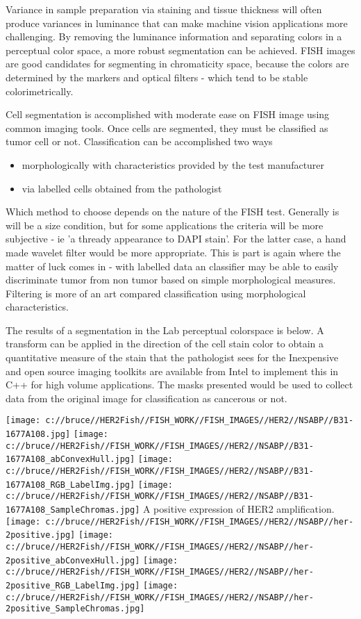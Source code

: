\documentclass[10pt]{amsart}
\theoremstyle{definition}
\theoremstyle{remark}
\numberwithin{equation}{section}
\begin{document}
Variance in sample preparation via staining and tissue thickness
will often produce variances in luminance that can make machine
vision applications more challenging.  By removing the luminance
information and separating colors in a perceptual color space, a
more robust segmentation can be achieved.  FISH images are good
candidates for segmenting in chromaticity space, because the
colors are determined by the markers and optical filters - which
tend to be stable colorimetrically.

Cell segmentation is accomplished with moderate ease on FISH image
using common imaging tools. Once cells are segmented, they must be
classified as tumor cell or not. Classification can be
accomplished two ways
\begin{itemize} \item morphologically with characteristics
provided by the test manufacturer \item via labelled cells
obtained from the pathologist
\end{itemize}
Which method to choose depends on the nature of the FISH test.
Generally is will be a size condition, but for some applications
the criteria will be more subjective - ie 'a thready appearance to
DAPI stain'.  For the latter case, a hand made wavelet filter
would be more appropriate.  This is part is again where the matter
of luck comes in - with labelled data an classifier may be able to
easily discriminate tumor from non tumor based on simple
morphological measures.  Filtering is more of an art compared
classification using morphological characteristics.

The results of a segmentation in the Lab perceptual colorspace is
below.  A transform can be applied in the direction of the cell
stain color to obtain a quantitative measure of the stain that the
pathologist sees for the Inexpensive and open source imaging
toolkits are available from Intel to implement this in C++ for
high volume applications.  The masks presented would be used to
collect data from the original image for classification as
cancerous or not.

\newpage
\texttt{[image: c://bruce//HER2Fish//FISH\_WORK//FISH\_IMAGES//HER2//NSABP//B31-1677A108.jpg]}
\texttt{[image: c://bruce//HER2Fish//FISH\_WORK//FISH\_IMAGES//HER2//NSABP//B31-1677A108\_abConvexHull.jpg]}
\texttt{[image: c://bruce//HER2Fish//FISH\_WORK//FISH\_IMAGES//HER2//NSABP//B31-1677A108\_RGB\_LabelImg.jpg]}
\texttt{[image: c://bruce//HER2Fish//FISH\_WORK//FISH\_IMAGES//HER2//NSABP//B31-1677A108\_SampleChromas.jpg]}
\newpage
A positive expression of HER2 amplification.\newline
\texttt{[image: c://bruce//HER2Fish//FISH\_WORK//FISH\_IMAGES//HER2//NSABP//her-2positive.jpg]}
\texttt{[image: c://bruce//HER2Fish//FISH\_WORK//FISH\_IMAGES//HER2//NSABP//her-2positive\_abConvexHull.jpg]}
\texttt{[image: c://bruce//HER2Fish//FISH\_WORK//FISH\_IMAGES//HER2//NSABP//her-2positive\_RGB\_LabelImg.jpg]}
\texttt{[image: c://bruce//HER2Fish//FISH\_WORK//FISH\_IMAGES//HER2//NSABP//her-2positive\_SampleChromas.jpg]}
\newpage
\end{document}
